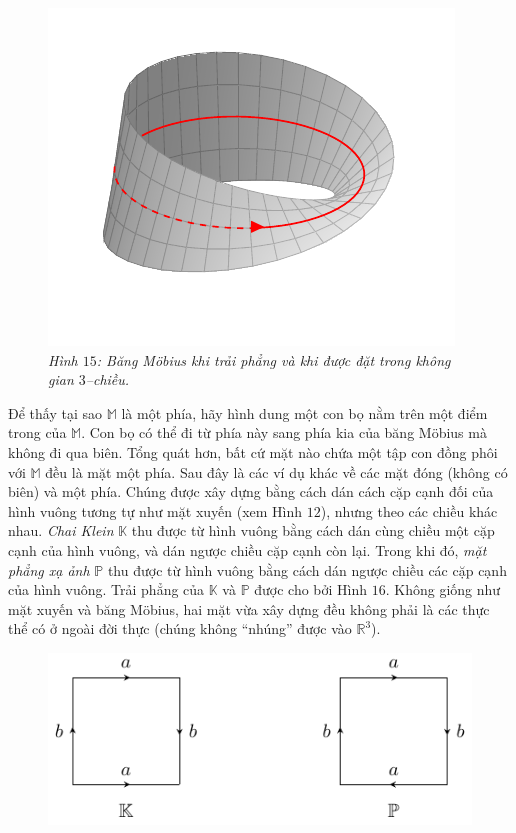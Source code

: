 \begin{multicols}{2}
\begin{figure}[H]
		\includegraphics[width=0.48\linewidth]{H15_2.pdf}
		\caption{\small\textit{\color{duongvaotoanhoc}Hình $15$: Băng M\"obius khi trải phẳng và khi được đặt trong không gian $3$--chiều.}}
		\vspace*{-10pt}
	\end{figure}
	Để thấy tại sao $\mathbb{M}$ là một phía, hãy hình dung một con bọ nằm trên một điểm trong của $\mathbb{M}$. Con bọ có thể đi từ phía này sang phía kia của băng M\"obius mà không đi qua biên.
	\vskip 0.1cm
	Tổng quát hơn, bất cứ mặt nào chứa một tập con đồng phôi với $\mathbb{M}$ đều là mặt một phía. Sau đây là các ví dụ khác về các mặt đóng (không có biên) và một phía. Chúng được xây dựng bằng cách dán cách cặp cạnh đối của hình vuông tương tự như mặt xuyến (xem Hình $12$), nhưng theo các chiều khác nhau. {\it Chai Klein} $\mathbb{K}$ thu được từ hình vuông bằng cách dán cùng chiều một cặp cạnh của hình vuông, và dán ngược chiều cặp cạnh còn lại. Trong khi đó, {\it mặt phẳng xạ ảnh} $\mathbb{P}$ thu được từ hình vuông bằng cách dán ngược chiều các cặp cạnh của hình vuông. Trải phẳng của $\mathbb{K}$ và $\mathbb{P}$ được cho bởi Hình $16$. Không giống như mặt xuyến và băng M\"obius, hai mặt vừa xây dựng đều không phải là các thực thể có ở ngoài đời thực (chúng không ``nhúng'' được vào $\mathbb{R}^3$).
	\begin{figure}[H]
		\vspace*{-5pt}
		\centering\captionsetup{labelformat=empty, justification=centering}
		\includegraphics[width=1\linewidth]{H16.pdf}

\end{figure}
\end{multicols}
